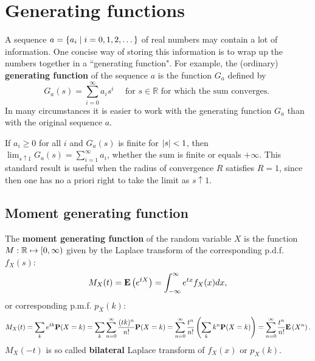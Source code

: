 \section{Generating functions}
A sequence $a = \{a_i \;\vert\; i = 0, 1 , 2, \dots \}$ of real numbers may contain a lot of information. One concise way of storing this information is to wrap up the numbers together in a ``generating function". For example, the (ordinary) \textbf{generating function} of the sequence $a$ is the function $G_a$ defined by 
\begin{equation*}
    G_{a}(s)=\sum_{i=0}^{\infty} a_{i} s^{i} \quad \text { for } s \in \mathbb{R} \text { for which the sum converges. }
\end{equation*}
In many circumstances it is easier to work with the generating function $G_a$ than with the original sequence $a$.

\begin{theorem}
If $a_i \geq 0$ for all $i$ and $G_a(s)$ is finite for $\left\vert s \right\vert < 1$, then $\lim_{s \uparrow 1} G_a (s) = \sum_{i=1}^ \infty a_i$, whether the sum is finite or equals $+\infty$. This standard result is useful when the radius of convergence $R$ satisfies $R = 1$, since then one has no a priori right to take the limit as $s \uparrow 1$.
\end{theorem}


\subsection{Moment generating function}
\begin{definition}
The \textbf{moment generating function} of the random variable $X$ is the function $M: \mathbb{R} \mapsto [0, \infty)$ given by the Laplace transform of the corresponding p.d.f. $f_X(s)$:
\begin{equation*}
    M_X(t) = \mathbf{E} \left( e^{tX} \right) = \int_{-\infty}^\infty e^{tx} f_X(x) dx,
\end{equation*}
or corresponding p.m.f. $p_X(k)$:
\begin{equation*}
    M_X(t) = \sum_{k} e^{t k} \mathbf{P}(X=k) 
    = \sum_k \sum_{n=0}^{\infty} \frac{(t k)^{n}}{n !} \mathbf{P}(X=k)
    = \sum_{n=0}^{\infty} \frac{t^{n}}{n !}\left(\sum_k k^{n} \mathbf{P}(X=k)\right) 
    = \sum_{n=0}^{\infty} \frac{t^{n}}{n !} \mathbf{E}\left(X^{n}\right).
\end{equation*}
$M_X(-t)$ is so called \textbf{bilateral} Laplace transform of $f_X(x)$ or $p_X(k)$.
\end{definition}

